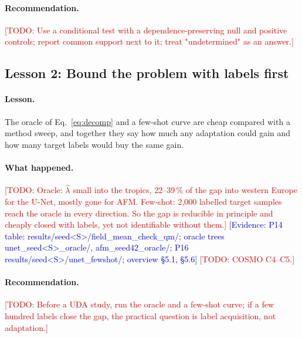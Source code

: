 \documentclass{article}
\newcommand{\todo}[1]{\textcolor{red}{[TODO: #1]}}
\newcommand{\ev}[1]{\textcolor{blue}{[Evidence: #1]}}
\newcommand{\lamhat}{\hat{\lambda}}
\begin{document}
\paragraph{Recommendation.} \todo{Use a conditional test with a
dependence-preserving null and positive controls; report common support
next to it; treat "undetermined" as an answer.}


\subsection{Lesson 2: Bound the problem with labels first}
\label{sec:L2}

\paragraph{Lesson.} The oracle of Eq.~\eqref{eq:decomp} and a few-shot
curve are cheap compared with a method sweep, and together they say how
much any adaptation could gain and how many target labels would buy the
same gain.

\paragraph{What happened.} \todo{Oracle: $\lamhat$ small into the tropics,
22--39\,\% of the gap into western Europe for the U-Net, mostly gone for
AFM. Few-shot: 2,000 labelled target samples reach the oracle in every
direction. So the gap is reducible in principle and cheaply closed with
labels, yet not identifiable without them.}
\ev{P14 table: results/seed<S>/field\_mean\_check\_qm/; oracle trees
unet\_seed<S>\_oracle/, afm\_seed42\_oracle/; P16 results/seed<S>/unet\_fewshot/;
overview \S5.1, \S5.6}
\todo{COSMO C4--C5.}

\paragraph{Recommendation.} \todo{Before a UDA study, run the oracle and
a few-shot curve; if a few hundred labels close the gap, the practical
question is label acquisition, not adaptation.}


\end{document}
